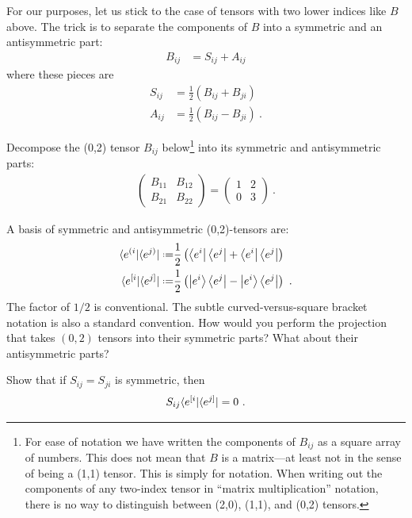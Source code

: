 \documentclass[12pt, oneside]{report}    %
\begin{document}
\begin{subappendices}
For our purposes, let us stick to the case of tensors with two lower indices like $B$ above. The trick is to separate the components of $B$ into a symmetric and an antisymmetric part:
\begin{align}
    B_{ij} &= S_{ij}+A_{ij}
\end{align}
where these pieces are 
\begin{align}
    S_{ij} &= \frac{1}{2} \left(B_{ij} + B_{ji}\right)
    \\
    A_{ij} &= \frac{1}{2} \left(B_{ij} - B_{ji}\right) \ .
\end{align}
\begin{exercise}
Decompose the (0,2) tensor $B_{ij}$ below\footnote{For ease of notation we have written the components of $B_{ij}$ as a square array of numbers. This does not mean that $B$ is a matrix---at least not in the sense of being a (1,1) tensor. This is simply for notation. When writing out the components of any two-index tensor in ``matrix multiplication'' notation, there is no way to distinguish between (2,0), (1,1), and (0,2) tensors.} into its symmetric and antisymmetric parts:
\begin{align}
    \begin{pmatrix}
        B_{11} & B_{12}\\
        B_{21} & B_{22}
    \end{pmatrix}
    =
    \begin{pmatrix}
        1 & 2\\
        0 & 3
    \end{pmatrix} \ .
\end{align}
\end{exercise}


\begin{exercise}
A basis of symmetric and antisymmetric (0,2)-tensors are:
\begin{align}
    \la{e^{(i}}|\la{e^{j)}}|
    \defeq&
    \frac{1}{2}\left( 
        \bra{e^i}\bra{e^j} + \bra{e^i}\bra{e^j}
    \right)
    \\
    \la{e^{[i}}|\la{e^{j]}}|
    \defeq&
    \frac{1}{2}\left( 
        \ket{e^i}\bra{e^j} - \ket{e^i}\bra{e^j}
    \right) \ .
\end{align}
The factor of $1/2$ is conventional. The subtle curved-versus-square bracket notation is also a standard convention. How would you perform the projection that takes $(0,2)$ tensors into their symmetric parts? What about their antisymmetric parts?

Show that if $S_{ij} = S_{ji}$ is symmetric, then 
\begin{align}
     S_{ij}\langle{e^{[i}}|\langle{e^{j]}}| = 0 \ .
 \end{align}
\end{exercise}



\end{subappendices}
\end{document}
